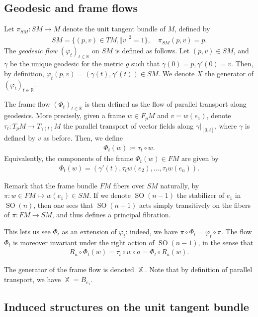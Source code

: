 \documentclass[12pt]{amsart}
\numberwithin{numbering}{section}
\theoremstyle{plain}
\theoremstyle{definition}
\theoremstyle{remark}
\numberwithin{equation}{section}
\DeclareMathOperator{\SO}{SO}
\DeclareMathOperator{\xx}{\mathbb{X}}
\newcommand{\psm}{\pi_{SM}}
\newcommand{\R}{\mathbb{R}}
\begin{document}
\subsection{Geodesic and frame flows} \label{sec:geod_frame_flows}

Let $\psm: SM \to M$ denote the unit tangent bundle of $M$, defined by 
\begin{align*}
   SM = \{(p, v) \in TM, \Vert v \Vert^2 = 1 \}, \quad \psm(p, v) = p.
\end{align*}
The \emph{geodesic flow} $(\varphi_t)_{t \in \R}$ on $SM$ is defined as follows. Let $(p, v) \in SM$, and $\gamma$ be the unique geodesic for the metric $g$ such that $\gamma(0) = p, \gamma'(0) = v$. Then, by definition, $\varphi_t(p, v) = (\gamma(t), \gamma'(t)) \in SM$. We denote $X$ the generator of $(\varphi_t)_{t \in \R}$.

The frame flow $(\Phi_t)_{t \in \R}$ is then defined as the flow of parallel transport along geodesics. More precisely, given a frame $w \in F_pM$ and $v = w(e_1)$, denote $\tau_t: T_p M \to T_{\gamma(t)} M$ the parallel transport of vector fields along $\gamma \vert_{[0, t]}$, where $\gamma$ is defined by $v$ as before. Then, we define 
\begin{align}
\Phi_t(w) \coloneq \tau_t \circ w.
\end{align}
Equivalently, the components of the frame $\Phi_t(w) \in FM$ are given by 
\begin{align*}
\Phi_t(w) = (\gamma'(t), \tau_t w(e_2), \ldots, \tau_t w(e_n)).
\end{align*}

Remark that the frame bundle $FM$ fibers over $SM$ naturally, by $\pi: w \in FM \mapsto w(e_1) \in SM$. If we denote $\SO(n-1)$ the stabilizer of $e_1$ in $\SO(n)$, then one sees that $\SO(n-1)$ acts simply transitively on the fibers of $\pi: FM \to SM$, and thus defines a principal fibration.

This lets us see $\Phi_t$ as an extension of $\varphi_t$: indeed, we have $\pi \circ \Phi_t = \varphi_t \circ \pi$. The flow $\Phi_t$ is moreover invariant under the right action of $\SO(n-1)$, in the sense that 
\begin{align*}
R_a \circ \Phi_t(w) = \tau_t \circ w \circ a  = \Phi_t \circ R_a(w).
\end{align*}

The generator of the frame flow is denoted $\xx$. Note that by definition of parallel transport, we have $\xx = B_{e_1}$.

\subsection{Induced structures on the unit tangent bundle} \label{sec:induced_sm}
\end{document}
